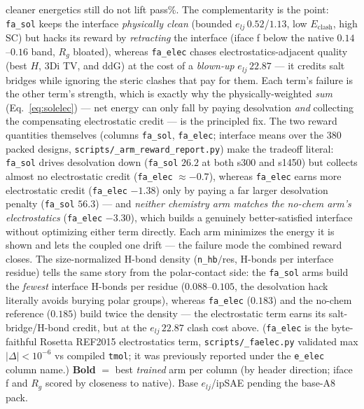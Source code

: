 \documentclass[11pt]{article}
\newcommand{\ttk}[1]{\texttt{\small #1}}
\begin{document}
\begin{table}[htbp]
{cleaner energetics still do not lift pass\%.
The complementarity is the point: \ttk{fa\_sol} keeps the interface \emph{physically clean} (bounded
$e_{lj}\,0.52$/$1.13$, low $E_{\mathrm{clash}}$, high SC) but hacks its reward by \emph{retracting}
the interface (iface f below the native $0.14$--$0.16$ band, $R_g$ bloated), whereas \ttk{fa\_elec}
chases electrostatics-adjacent quality (best $H$, 3Di TV, and ddG) at the cost of a \emph{blown-up}
$e_{lj}\,22.87$ --- it credits salt bridges while ignoring the steric clashes that pay for them. Each
term's failure is the other term's strength, which is exactly why the physically-weighted \emph{sum}
(Eq.\ \ref{eq:solelec}) --- net energy can only fall by paying desolvation \emph{and} collecting the
compensating electrostatic credit --- is the principled fix. The two reward quantities themselves
(columns \ttk{fa\_sol}, \ttk{fa\_elec}; interface means over the $380$ packed designs,
\ttk{scripts/\_arm\_reward\_report.py}) make the tradeoff literal: \ttk{fa\_sol} drives desolvation down
(\ttk{fa\_sol} $26.2$ at both s300 and s1450) but collects almost no electrostatic credit
(\ttk{fa\_elec} ${\approx}{-}0.7$), whereas \ttk{fa\_elec} earns more electrostatic credit
(\ttk{fa\_elec} ${-}1.38$) only by paying a far larger desolvation penalty (\ttk{fa\_sol} $56.3$) ---
and \emph{neither chemistry arm matches the no-chem arm's electrostatics} (\ttk{fa\_elec} ${-}3.30$),
which builds a genuinely better-satisfied interface without optimizing either term directly. Each arm
minimizes the energy it is shown and lets the coupled one drift --- the failure mode the combined
reward closes. The size-normalized H-bond density (\ttk{n\_hb}$/$res, H-bonds per interface residue)
tells the same story from the polar-contact side: the \ttk{fa\_sol} arms build the \emph{fewest}
interface H-bonds per residue ($0.088$--$0.105$, the desolvation hack literally avoids burying polar
groups), whereas \ttk{fa\_elec} ($0.183$) and the no-chem reference ($0.185$) build twice the density
--- the electrostatic term earns its salt-bridge/H-bond credit, but at the $e_{lj}\,22.87$ clash cost
above. (\ttk{fa\_elec} is the byte-faithful Rosetta REF2015 electrostatics term, \ttk{scripts/\_faelec.py}
validated max$|\Delta|<10^{-6}$ vs compiled \ttk{tmol}; it was previously reported under the
\ttk{e\_elec} column name.) \textbf{Bold} $=$ best \emph{trained} arm
per column (by header direction; iface f and $R_g$ scored by closeness to native). Base
$e_{lj}$/ipSAE pending the base-A8 pack.}
\label{tab:chemeval}
\end{table}
\end{document}

